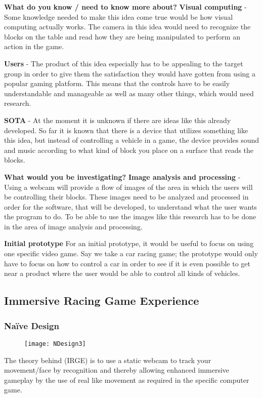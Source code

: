 \noindent\textbf{What do you know / need to know more about?} \newline
\noindent\textbf{Visual computing} - Some knowledge needed to make this idea come true would be how visual computing actually works. The camera in this idea would need to recognize the blocks on the table and read how they are being manipulated to perform an action in the game. 
\bigskip

\noindent\textbf{Users} - The product of this idea especially has to be appealing to the target group in order to give them the satisfaction they would have gotten from using a popular gaming platform. This means that the controls have to be easily understandable and manageable as well as many other things, which would need research.
\bigskip

\noindent\textbf{SOTA} - At the moment it is unknown if there are ideas like this already developed. So far it is known that there is a device that utilizes something like this idea, but instead of controlling a vehicle in a game, the device provides sound and music according to what kind of block you place on a surface that reads the blocks.
\bigskip

\noindent\textbf{What would you be investigating?} \newline
\noindent\textbf{Image analysis and processing} - 
Using a webcam will provide a flow of images of the area in which the users will be controlling their blocks. These images need to be analyzed and processed in order for the software, that will be developed, to understand what the user wants the program to do. To be able to use the images like this research has to be done in the area of image analysis and processing.
\bigskip

\noindent\textbf{Initial prototype} \newline
For an initial prototype, it would be useful to focus on using one specific video game. Say we take a car racing game; the prototype would only have to focus on how to control a car in order to see if it is even possible to get near a product where the user would be able to control all kinds of vehicles.

\pagebreak

\subsection{Immersive Racing Game Experience} \label{nd3}
\subsubsection*{Naïve Design}
\begin{figure}[h]
\centering
\texttt{[image: NDesign3]}
\caption{}
\label{fig:ndesign3}
\end{figure}
The theory behind (IRGE) is to use a static webcam to track your movement/face by recognition and thereby allowing enhanced immersive gameplay by the use of real like movement as required in the specific computer game.


